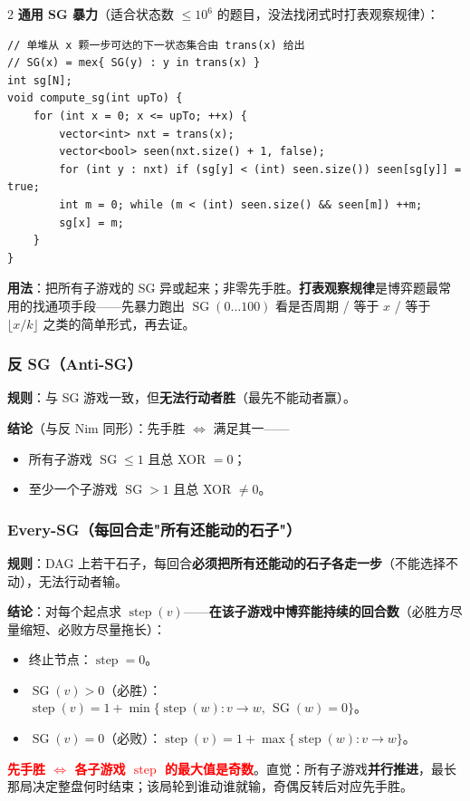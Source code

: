 \begin{multicols*}{2}
		\textbf{通用 SG 暴力}（适合状态数 $\le 10^6$ 的题目，没法找闭式时打表观察规律）：

		\begin{verbatim}
// 单堆从 x 颗一步可达的下一状态集合由 trans(x) 给出
// SG(x) = mex{ SG(y) : y in trans(x) }
int sg[N];
void compute_sg(int upTo) {
    for (int x = 0; x <= upTo; ++x) {
        vector<int> nxt = trans(x);
        vector<bool> seen(nxt.size() + 1, false);
        for (int y : nxt) if (sg[y] < (int) seen.size()) seen[sg[y]] = true;
        int m = 0; while (m < (int) seen.size() && seen[m]) ++m;
        sg[x] = m;
    }
}
		\end{verbatim}

		\textbf{用法}：把所有子游戏的 SG 异或起来；非零先手胜。\textbf{打表观察规律}是博弈题最常用的找通项手段——先暴力跑出 $\operatorname{SG}(0\dots 100)$ 看是否周期 / 等于 $x$ / 等于 $\lfloor x/k \rfloor$ 之类的简单形式，再去证。

		\subsubsection{反 SG（Anti-SG）}

		\textbf{规则}：与 SG 游戏一致，但\textbf{无法行动者胜}（最先不能动者赢）。

		\textbf{结论}（与反 Nim 同形）：先手胜 $\iff$ 满足其一——
		\begin{itemize}
			\item 所有子游戏 $\operatorname{SG} \le 1$ 且总 XOR $=0$；
			\item 至少一个子游戏 $\operatorname{SG} > 1$ 且总 XOR $\neq 0$。
		\end{itemize}

		\subsubsection{Every-SG（每回合走"所有还能动的石子"）}

		\textbf{规则}：DAG 上若干石子，每回合\textbf{必须把所有还能动的石子各走一步}（不能选择不动），无法行动者输。

		\textbf{结论}：对每个起点求 $\operatorname{step}(v)$——\textbf{在该子游戏中博弈能持续的回合数}（必胜方尽量缩短、必败方尽量拖长）：
		\begin{itemize}
			\item 终止节点：$\operatorname{step} = 0$。
			\item $\operatorname{SG}(v) > 0$（必胜）：$\operatorname{step}(v) = 1 + \min\{\operatorname{step}(w) : v \to w,\, \operatorname{SG}(w) = 0\}$。
			\item $\operatorname{SG}(v) = 0$（必败）：$\operatorname{step}(v) = 1 + \max\{\operatorname{step}(w) : v \to w\}$。
		\end{itemize}
		\textcolor{red}{\textbf{先手胜 $\iff$ 各子游戏 $\operatorname{step}$ 的最大值是奇数}}。直觉：所有子游戏\textbf{并行推进}，最长那局决定整盘何时结束；该局轮到谁动谁就输，奇偶反转后对应先手胜。


\end{multicols*}
